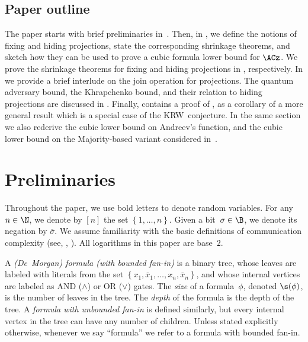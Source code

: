 %
\subsection{Paper outline}   %

The paper starts with brief preliminaries in~. Then,
in , we define the notions of fixing and hiding
projections, state the corresponding shrinkage theorems, and sketch
how they can be used to prove a cubic formula lower bound for $\ACz$.
We prove the shrinkage theorems for fixing and hiding projections in
, %
 respectively.
In  we provide a brief interlude on the join operation
for projections. The quantum adversary bound, the Khrapchenko bound,
and their relation to hiding projections are discussed in .
Finally,  contains a proof of ,
as a corollary of a more general result which is a special case of
the KRW~conjecture. In the same section we also rederive the cubic
lower bound on Andreev's function, and the cubic lower bound on the
Majority-based variant considered in~\cite{GTN19}.

\section{\label{sec:prel}Preliminaries}

Throughout the paper, we use bold letters to denote random variables.
For any $n\in\N$, we denote by $\left[n\right]$ the set $\left\{ 1,\ldots,n\right\} $.
Given a bit~$\sigma\in\B$, we denote its negation by $\overline{\sigma}$.
We assume familiarity with the basic definitions of communication
complexity (see, \eg, \cite{KN_book}). All logarithms in this paper
are base~$2$. 
\begin{definition}
A \emph{(De~Morgan) formula (with bounded fan-in)} is a binary tree,
whose leaves are labeled with literals from the set $\left\{ x_{1},\overline{x}_{1},\ldots,x_{n},\overline{x}_{n}\right\} $,
and whose internal vertices are labeled as AND ($\wedge$) or OR ($\vee$)
gates. The \emph{size} of a formula~$\phi$, denoted $\s(\phi)$,
is the number of leaves in the tree. The \emph{depth} of the formula
is the depth of the tree. A \emph{formula with unbounded fan-in} is
defined similarly, but every internal vertex in the tree can have
any number of children. Unless stated explicitly otherwise, whenever
we say ``formula'' we refer to a formula with bounded fan-in. 
\end{definition}

